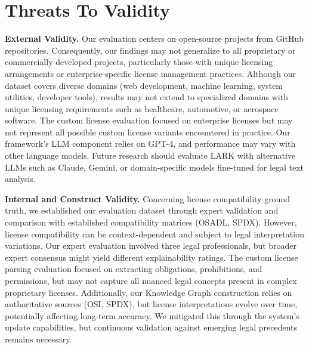 \section{Threats To Validity}
\label{Section:Threats}

\textbf{External Validity.} Our evaluation centers on open-source projects from GitHub repositories. Consequently, our findings may not generalize to all proprietary or commercially developed projects, particularly those with unique licensing arrangements or enterprise-specific license management practices. Although our dataset covers diverse domains (web development, machine learning, system utilities, developer tools), results may not extend to specialized domains with unique licensing requirements such as healthcare, automotive, or aerospace software. The custom license evaluation focused on enterprise licenses but may not represent all possible custom license variants encountered in practice. Our framework's LLM component relies on GPT-4, and performance may vary with other language models. Future research should evaluate LARK with alternative LLMs such as Claude, Gemini, or domain-specific models fine-tuned for legal text analysis.

\textbf{Internal and Construct Validity.} Concerning license compatibility ground truth, we established our evaluation dataset through expert validation and comparison with established compatibility matrices (OSADL, SPDX). However, license compatibility can be context-dependent and subject to legal interpretation variations. Our expert evaluation involved three legal professionals, but broader expert consensus might yield different explainability ratings. The custom license parsing evaluation focused on extracting obligations, prohibitions, and permissions, but may not capture all nuanced legal concepts present in complex proprietary licenses. Additionally, our Knowledge Graph construction relies on authoritative sources (OSI, SPDX), but license interpretations evolve over time, potentially affecting long-term accuracy. We mitigated this through the system's update capabilities, but continuous validation against emerging legal precedents remains necessary.



